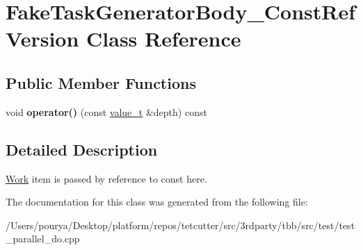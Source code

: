 \hypertarget{classFakeTaskGeneratorBody__ConstRefVersion}{}\section{Fake\+Task\+Generator\+Body\+\_\+\+Const\+Ref\+Version Class Reference}
\label{classFakeTaskGeneratorBody__ConstRefVersion}
\subsection*{Public Member Functions}
\begin{DoxyCompactItemize}
\item 
\hypertarget{classFakeTaskGeneratorBody__ConstRefVersion_a55f4b3da64847a573bf559d0ba3a4d1d}{}void {\bfseries operator()} (const \hyperlink{classvalue__t}{value\+\_\+t} \&depth) const \label{classFakeTaskGeneratorBody__ConstRefVersion_a55f4b3da64847a573bf559d0ba3a4d1d}

\end{DoxyCompactItemize}


\subsection{Detailed Description}
\hyperlink{structWork}{Work} item is passed by reference to const here. 

The documentation for this class was generated from the following file\+:\begin{DoxyCompactItemize}
\item 
/\+Users/pourya/\+Desktop/platform/repos/tetcutter/src/3rdparty/tbb/src/test/test\+\_\+parallel\+\_\+do.\+cpp\end{DoxyCompactItemize}
